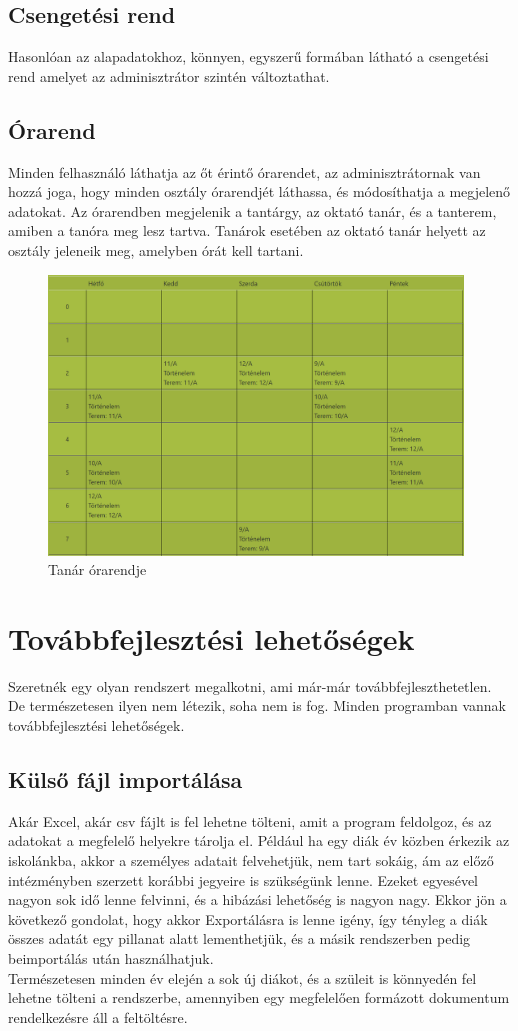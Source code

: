 \documentclass[
]{thesis-ekf}
\begin{document}
\section{Csengetési rend}
Hasonlóan az alapadatokhoz, könnyen, egyszerű formában látható a csengetési rend amelyet az adminisztrátor szintén változtathat.
\section{Órarend}
Minden felhasználó láthatja az őt érintő órarendet, az adminisztrátornak van hozzá joga, hogy minden osztály órarendjét láthassa, és módosíthatja a megjelenő adatokat. Az órarendben megjelenik a tantárgy, az oktató tanár, és a tanterem, amiben a tanóra meg lesz tartva. Tanárok esetében az oktató tanár helyett az osztály jeleneik meg, amelyben órát kell tartani.
\begin{figure}[ht]
	\centering
	\includegraphics[width=11cm]{kepek/orarend}
	\caption{Tanár órarendje}
	\label{fig:orarend}
\end{figure}

\chapter{Továbbfejlesztési lehetőségek}
Szeretnék egy olyan rendszert megalkotni, ami már-már továbbfejleszthetetlen. De természetesen ilyen nem létezik, soha nem is fog. Minden programban vannak továbbfejlesztési lehetőségek.
\section{Külső fájl importálása}
Akár Excel, akár csv fájlt is fel lehetne tölteni, amit a program feldolgoz, és az adatokat a megfelelő helyekre tárolja el. Például ha egy diák év közben érkezik az iskolánkba, akkor a személyes adatait felvehetjük, nem tart sokáig, ám az előző intézményben szerzett korábbi jegyeire is szükségünk lenne. Ezeket egyesével nagyon sok idő lenne felvinni, és a hibázási lehetőség is nagyon nagy. Ekkor jön a következő gondolat, hogy akkor Exportálásra is lenne igény, így tényleg a diák összes adatát egy pillanat alatt lementhetjük, és a másik rendszerben pedig beimportálás után használhatjuk.\\
Természetesen minden év elején a sok új diákot, és a szüleit is könnyedén fel lehetne tölteni a rendszerbe, amennyiben egy megfelelően formázott dokumentum rendelkezésre áll a feltöltésre.
\end{document}

